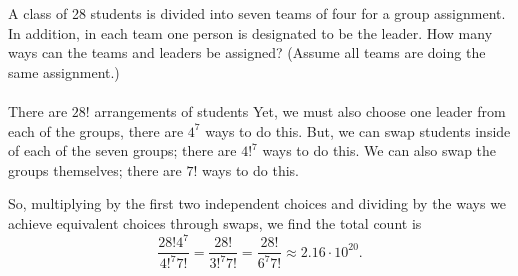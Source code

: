 \documentclass[../hw1]{subfiles}
\begin{document}
A class of 28 students is divided into seven teams of four for a group assignment.
In addition, in each team one person is designated to be the leader.
How many ways can the teams and leaders be assigned? (Assume all teams are doing the same assignment.)
\\\\
There are $28!$ arrangements of students
Yet, we must also choose one leader from each of the groups, there are $4^7$ ways to do this.
But, we can swap students inside of each of the seven groups; there are  $4!^7$ ways to do this.
We can also swap the groups themselves; there are  $7!$ ways to do this.

So, multiplying by the first two independent choices and dividing by the ways we achieve equivalent choices through swaps, we find the total count is \[
	\frac{28!4^7}{4!^7 7!}=\frac{28!}{3!^7 7!}=\frac{28!}{6^7 7!}\approx 2.16\cdot 10^{20}
	.\]
\\
\end{document}
